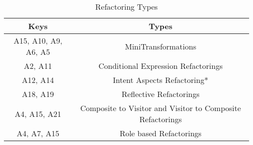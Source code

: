 \begin{table}[!htbp]
\caption{Refactoring Types}%
\label{tab-refactoring}
\begin{tabularx}{\textwidth}{c c}
\toprule%
\textbf{Keys}        & \textbf{Types}   \\      
\midrule%
A15, A10, A9, A6, A5 & MiniTransformations                                        \\
A2, A11              & Conditional Expression Refactorings                        \\
A12, A14             & Intent Aspects Refactoring*                                \\
A18, A19             & Reflective Refactorings                                    \\
A4, A15, A21         & Composite to Visitor and Visitor to Composite Refactorings \\
A4, A7, A15          & Role based Refactorings                                    \\
\bottomrule%
\end{tabularx}
\end{table}
\FloatBarrier
